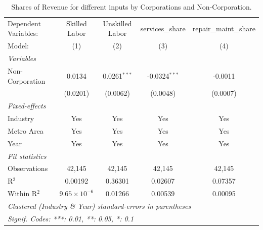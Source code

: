 \documentclass[
  12pt]{article}
\theoremstyle{definition}
\theoremstyle{remark}
\begin{document}
\begin{table}

\caption{\label{tbl-reg-shares-2}Shares of Revenue for different inputs
by Corporations and Non-Corporation.}

\begin{minipage}{\linewidth}

\begingroup
\centering
\begin{tabular}{lcccc}
   \tabularnewline \midrule \midrule
   Dependent Variables: & Skilled Labor         & Unskilled Labor & services\_share  & repair\_maint\_share\\    
   Model:               & (1)                   & (2)             & (3)              & (4)\\  
   \midrule
   \emph{Variables}\\
   Non-Corporation      & 0.0134                & 0.0261$^{***}$  & -0.0324$^{***}$  & -0.0011\\   
                        & (0.0201)              & (0.0062)        & (0.0048)         & (0.0007)\\   
   \midrule
   \emph{Fixed-effects}\\
   Industry             & Yes                   & Yes             & Yes              & Yes\\  
   Metro Area           & Yes                   & Yes             & Yes              & Yes\\  
   Year                 & Yes                   & Yes             & Yes              & Yes\\  
   \midrule
   \emph{Fit statistics}\\
   Observations         & 42,145                & 42,145          & 42,145           & 42,145\\  
   R$^2$                & 0.00192               & 0.36301         & 0.02607          & 0.07357\\  
   Within R$^2$         & $9.65\times 10^{-6}$  & 0.01266         & 0.00539          & 0.00095\\  
   \midrule \midrule
   \multicolumn{5}{l}{\emph{Clustered (Industry \& Year) standard-errors in parentheses}}\\
   \multicolumn{5}{l}{\emph{Signif. Codes: ***: 0.01, **: 0.05, *: 0.1}}\\
\end{tabular}
\par\endgroup

\end{minipage}%

\end{table}%
\end{document}
